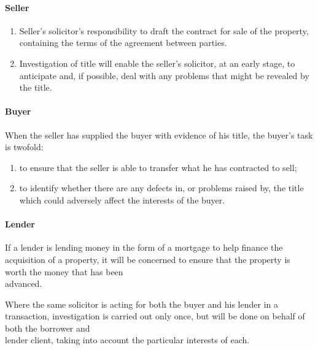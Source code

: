 \documentclass[
]{article}
\providecommand{\tightlist}{%
  \setlength{\itemsep}{0pt}\setlength{\parskip}{0pt}}
\begin{document}
\hypertarget{seller}{%
\paragraph{Seller}\label{seller}}

\begin{enumerate}
\def\labelenumi{\arabic{enumi}.}
\tightlist
\item
  Seller's solicitor's responsibility to draft the contract for sale of
  the property, containing the terms of the agreement between parties.
\item
  Investigation of title will enable the seller's solicitor, at an early
  stage, to anticipate and, if possible, deal with any problems that
  might be revealed by the title.
\end{enumerate}

\hypertarget{buyer}{%
\paragraph{Buyer}\label{buyer}}

When the seller has supplied the buyer with evidence of his title, the
buyer's task is twofold:

\begin{enumerate}
\def\labelenumi{\arabic{enumi}.}
\tightlist
\item
  to ensure that the seller is able to transfer what he has contracted
  to sell;
\item
  to identify whether there are any defects in, or problems raised by,
  the title which could adversely affect the interests of the buyer.
\end{enumerate}

\hypertarget{lender}{%
\paragraph{Lender}\label{lender}}

If a lender is lending money in the form of a mortgage to help finance
the acquisition of a property, it will be concerned to ensure that the
property is worth the money that has been\\
advanced.

Where the same solicitor is acting for both the buyer and his lender in
a transaction, investigation is carried out only once, but will be done
on behalf of both the borrower and\\
lender client, taking into account the particular interests of each.
\end{document}
